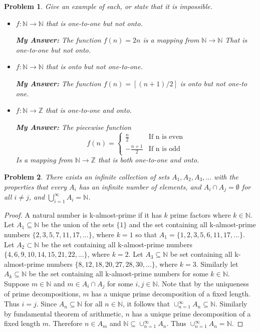 \documentclass[12pt]{article}
\newtheorem{problem}{Problem}
\newcommand{\NN}{\ensuremath{\mathbb N}}
\newcommand{\ZZ}{\ensuremath{\mathbb Z}}
\begin{document}
\begin{problem} %
Give an example of each, or state that it is impossible.
\begin{itemize}
\item[(a)] $f:\NN\to\NN$ that is one-to-one but not onto.

	\textbf{My Answer: } The function $f(n) = 2n$ is a mapping from $\NN \rightarrow \NN$ That is one-to-one but not onto.
\item[(b)] $f:\NN\to\NN$ that is onto but not one-to-one.

	\textbf{My Answer: } The function $f(n) = [(n+1)/2]$ is onto but not one-to one.
\item[(d)] $f:\NN\to\ZZ$ that is one-to-one and onto.

	\textbf{My Answer: } The piecewise function $$f(n) =\begin{cases} \frac{n}{2} & \text{If n is even} \\
	-\frac{n+1}{2} & \text{If n is odd}\end{cases} $$
		Is a mapping from $\NN \rightarrow \ZZ$ that is both one-to-one and onto.
	

\end{itemize}
\end{problem}



\begin{problem} %
There exists an infinite collection of sets $A_1,A_2,A_3,\dots$ with the properties that every $A_i$ has an infinite number of elements, and $A_i\cap A_j=\emptyset$ for all $i\ne j$, and $\bigcup_{i=1}^\infty A_i=\NN$. \end{problem}

\begin{proof}
	A natural number is k-almost-prime if it has $k$ prime factors where $k \in \NN$.
	Let $A_1 \subseteq \NN$ be the union of the sets $\{1\}$ and the set containing all k-almost-prime numbers $\{2,3,5,7,11,17, ...\}$, where $k = 1$ so that $A_1 = \{1,2,3,5,6,11,17,...\}$. Let $A_2 \subset \NN$ be the set containing all k-almost-prime numbers $\{4,6,9,10,14,15,21,22,...\}$, where $k = 2$. Let $A_3 \subseteq \NN$ be set containing all k-almost-prime numbers $\{8, 12, 18, 20, 27, 28, 30, … \}$, where $k = 3$. Similarly let $A_k \subseteq \NN$ be the set containing all k-almost-prime numbers for some $k \in \NN$. Suppose $m \in \NN$ and $m \in A_i \cap A_j$ for some $i, j \in \NN$. Note that by the uniqueness of prime decompositions, $m$ has a unique prime decomposition of a fixed length. Thus $i = j$. Since $A_n \subseteq \NN$ for all $n \in \NN$, it follows that $\cup_{n=1}^{\infty}A_n \subseteq \NN$. Similarly by fundamental theorem of arithmetic, $n$ has a unique prime decomposition of a fixed length $m$. Therefore $n \in A_m$ and $\NN \subseteq \cup_{n=1}^{\infty} A_n$. Thus $\cup_{n=1}^{\infty} A_n = \NN$.
\end{proof}
\end{document}
